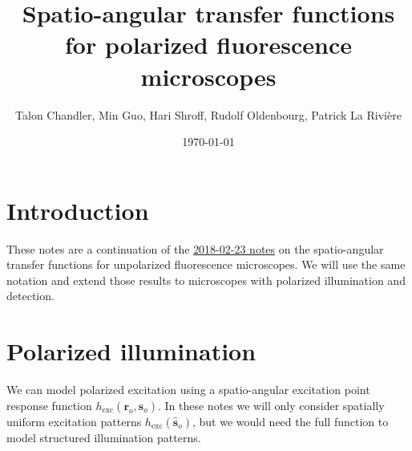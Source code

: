 \documentclass[11pt]{article}
\providecommand{\ro}[1]{\mathbf{\mathbf{r}}_o}
\providecommand{\so}[1]{\mathbf{\hat{s}}_o}
\begin{document}
\title{\vspace{-2.5em} Spatio-angular transfer functions for polarized fluorescence microscopes\vspace{-1em}}  \author{Talon Chandler, Min Guo, Hari Shroff, Rudolf Oldenbourg, Patrick La Rivi\`ere}
\date{\vspace{-1em}\today\vspace{-1em}}
\maketitle
\section{Introduction}
These notes are a continuation of the
\href{https://github.com/talonchandler/polharmonic/blob/master/notes/2018-02-23-spatio-angular-kernel/report/report.pdf}{2018-02-23
  notes} on the spatio-angular transfer functions for unpolarized fluorescence
microscopes. We will use the same notation and extend those results to microscopes
with polarized illumination and detection.

\section{Polarized illumination}
We can model polarized excitation using a spatio-angular excitation point
response function $h_{\text{exc}}(\ro{}, \so{})$. In these notes we will only
consider spatially uniform excitation patterns $h_{\text{exc}}(\so{})$, but we
would need the full function to model structured illumination patterns.
\end{document}
